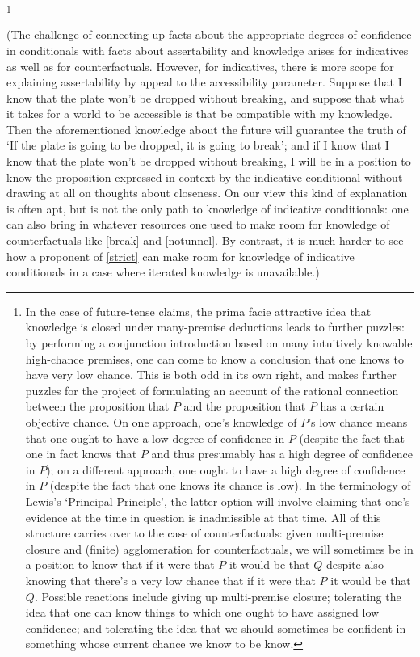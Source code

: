 \documentclass[If.tex]{subfiles}
\begin{document}
\footnote{In the case of future-tense claims, the prima facie attractive idea that knowledge is closed under many-premise deductions leads to further puzzles: by performing a conjunction introduction based on many intuitively knowable high-chance premises, one can come to know a conclusion that one knows to have very low chance. This is both odd in its own right, and makes further puzzles for the project of formulating an account of the rational connection between the proposition that $P$ and the proposition that $P$ has a certain objective chance.  On one approach, one's knowledge of $P$'s low chance means that one ought to have a low degree of confidence in $P$ (despite the fact that one in fact knows that $P$ and thus presumably has a high degree of confidence in $P$); on a different approach, one ought to have a high degree of confidence in $P$ (despite the fact that one knows its chance is low).  In the terminology of Lewis's ‘Principal Principle’, the latter option will involve claiming that one's evidence at the time in question is inadmissible at that time.  All of this structure carries over to the case of counterfactuals: given multi-premise closure and (finite) agglomeration for counterfactuals, we will sometimes be in a position to know that if it were that $P$ it would be that $Q$ despite also knowing that there's a very low chance that if it were that $P$ it would be that $Q$.  Possible reactions include giving up multi-premise closure; tolerating the idea that one can know things to which one ought to have assigned low confidence; and tolerating the idea that we should sometimes be confident in something whose current chance we know to be know.}

(The challenge of connecting up facts about the appropriate degrees of confidence in conditionals with facts about assertability and knowledge arises for indicatives as well as for counterfactuals. However, for indicatives, there is more scope for explaining assertability by appeal to the accessibility parameter. Suppose that I know that the plate won't be dropped without breaking, and suppose that what it takes for a world to be accessible is that be compatible with my knowledge. Then the aforementioned knowledge about the future will guarantee the truth of ‘If the plate is going to be dropped, it is going to break’; and if I know that I know that the plate won't be dropped without breaking, I will be in a position to know the proposition expressed in context by the indicative conditional without drawing at all on thoughts about closeness. On our view this kind of explanation is often apt, but is not the only path to knowledge of indicative conditionals: one can also bring in whatever resources one used to make room for knowledge of counterfactuals like \ref{break} and \ref{notunnel}. By contrast, it is much harder to see how a proponent of \ref{strict} can make room for knowledge of indicative conditionals in a case where iterated knowledge is unavailable.)
\end{document}
